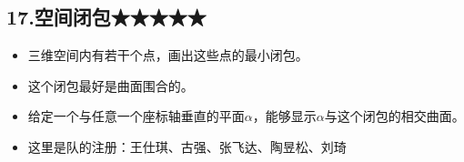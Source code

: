 \documentclass[11pt]{article}
\providecommand{\tightlist}{%
      \setlength{\itemsep}{0pt}\setlength{\parskip}{0pt}}
\begin{document}
    \subsection{17.空间闭包★★★★★}\label{ux7a7aux95f4ux95edux5305}

\begin{itemize}
\tightlist
\item
  三维空间内有若干个点，画出这些点的最小闭包。
\item
  这个闭包最好是曲面围合的。
\item
  给定一个与任意一个座标轴垂直的平面\(\alpha\)，能够显示\(\alpha\)与这个闭包的相交曲面。
\item
  这里是队的注册：王仕琪、古强、张飞达、陶昱松、刘琦
\end{itemize}


    
    
    
    
\end{document}
